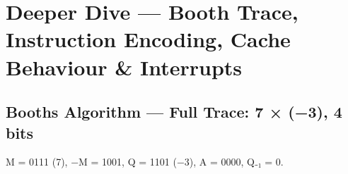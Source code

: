\needspace{196pt}

\hypertarget{p2-02--11-deeper-dive--booth-trace-instruction-encoding-cache-behaviour--interrupts}{%
\section{Deeper Dive --- Booth Trace, Instruction Encoding, Cache Behaviour \& Interrupts}\label{p2-02--11-deeper-dive--booth-trace-instruction-encoding-cache-behaviour--interrupts}}

\needspace{160pt}

\hypertarget{p2-02--111-booths-algorithm--full-trace-7--3-4-bits}{%
\subsection{Booth\textquotesingle s Algorithm --- Full Trace: 7 × (−3), 4 bits}\label{p2-02--111-booths-algorithm--full-trace-7--3-4-bits}}

M = 0111 (7), −M = 1001, Q = 1101 (−3), A = 0000, Q₋₁ = 0.

\begingroup\small

